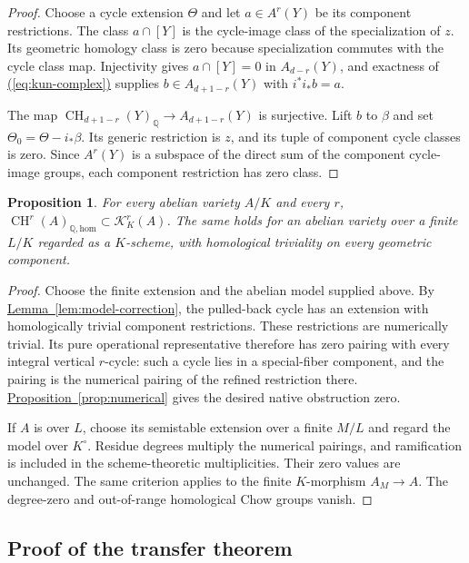 \documentclass[11pt,a4paper]{article}
\newtheorem{proposition}[theorem]{Proposition}
\theoremstyle{definition}
\theoremstyle{remark}\newtheorem{remark}[theorem]{Remark}
\numberwithin{equation}{section}
\newcommand{\Q}{\mathbb Q}\newcommand{\R}{\mathbb R}\newcommand{\C}{\mathbb C}
\newcommand{\CH}{\operatorname{CH}}\newcommand{\an}{\mathrm{an}}
\newcommand{\homol}{\mathrm{hom}}\newcommand{\BC}{\mathrm{BC}}
\newcommand{\propref}[1]{\hyperref[#1]{\textcolor{resultlink}{Proposition~\ref*{#1}}}}
\newcommand{\lemref}[1]{\hyperref[#1]{\textcolor{resultlink}{Lemma~\ref*{#1}}}}
\renewcommand{\eqref}[1]{\hyperref[#1]{\textcolor{equationlink}{(\ref*{#1})}}}
\begin{document}
\begin{proof}
Choose a cycle extension $\Theta$ and let $a\in A^r(Y)$ be its
component restrictions. The class $a\cap[Y]$ is the cycle-image class
of the specialization of $z$. Its geometric homology class is zero
because specialization commutes with the cycle class map. Injectivity
gives $a\cap[Y]=0$ in $A_{d-r}(Y)$, and exactness of
\eqref{eq:kun-complex} supplies $b\in A_{d+1-r}(Y)$ with
$i^*i_*b=a$.

The map $\CH_{d+1-r}(Y)_\Q\to A_{d+1-r}(Y)$ is surjective.
Lift $b$ to $\beta$ and set $\Theta_0=\Theta-i_*\beta$. Its generic
restriction is $z$, and its tuple of component cycle classes is zero.
Since $A^r(Y)$ is a subspace of the direct sum of the component
cycle-image groups, each component restriction has zero class.
\end{proof}

\begin{proposition}\label{prop:abelian-zero}
For every abelian variety $A/K$ and every $r$,
$\CH^r(A)_{\Q,\homol}\subset\mathcal K_K^r(A)$. The same
holds for an abelian variety over a finite $L/K$ regarded as a
$K$-scheme, with homological triviality on every geometric component.
\end{proposition}

\begin{proof}
Choose the finite extension and the abelian model supplied above.
By \lemref{lem:model-correction}, the pulled-back cycle has an
extension with homologically trivial component restrictions. These
restrictions are numerically trivial. Its pure operational
representative therefore has zero pairing with every integral
vertical $r$-cycle: such a cycle lies in a special-fiber component,
and the pairing is the numerical pairing of the refined restriction
there. \propref{prop:numerical} gives the desired native obstruction
zero.

If $A$ is over $L$, choose its semistable extension over a finite
$M/L$ and regard the model over $K^\circ$. Residue degrees multiply
the numerical pairings, and ramification is included in the
scheme-theoretic multiplicities. Their zero values are unchanged.
The same criterion applies to the finite $K$-morphism $A_M\to A$.
The degree-zero and out-of-range homological Chow groups vanish.
\end{proof}

\subsection{Proof of the transfer theorem}\label{proof:main}
\end{document}
